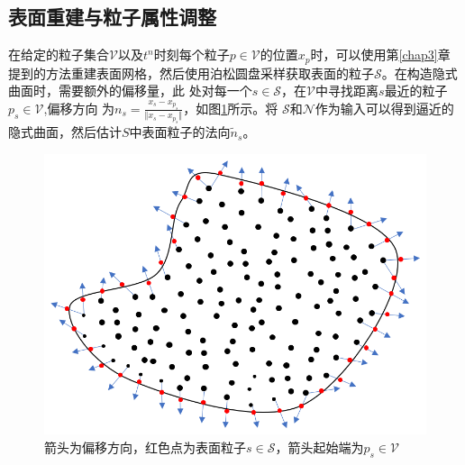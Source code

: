 \subsection{表面重建与粒子属性调整}
在给定的粒子集合$\mathcal{V}$以及$t^n$时刻每个粒子$p \in \mathcal{V}$的位置$x_p$时，可以使用第\ref{chap3}章
提到的方法重建表面网格，然后使用泊松圆盘采样获取表面的粒子$\mathcal{S}$。在构造隐式曲面时，需要额外的偏移量，此
处对每一个$s\in \mathcal{S}$，在$\mathcal{V}$中寻找距离$s$最近的粒子$p_s \in \mathcal{V}$,偏移方向
为$n_s = \frac{x_s - x_{p_s}}{\Vert x_s - x_{p_s} \Vert}$，如图\ref{fig: offset of surface particle}所示。将
$\mathcal{S}$和$\mathcal{N}$作为输入可以得到逼近的隐式曲面，然后估计$S$中表面粒子的法向$\tilde{n}_s$。
\begin{figure}[htbp]
    \centering
    \includegraphics[scale=0.7]{./images/image15.png}
    \caption[表面粒子定向估计]{箭头为偏移方向，红色点为表面粒子$s\in \mathcal{S}$，箭头起始端为$p_s \in\mathcal{V}$}
    \label{fig: offset of surface particle}
\end{figure}

